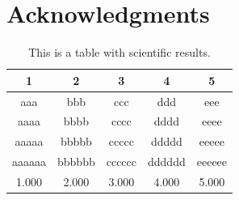 \documentclass[a4paper,11pt]{article}
\begin{document}
 



\section{ Acknowledgments }




\begin{table}
\centering
\caption{This is a table with scientific results.}
\medskip
\begin{tabular}{ccccc}
\hline
1 & 2 & 3 & 4 & 5\\
\hline
aaa & bbb & ccc & ddd & eee\\
aaaa & bbbb & cccc & dddd & eeee\\
aaaaa & bbbbb & ccccc & ddddd & eeeee\\
aaaaaa & bbbbbb & cccccc & dddddd & eeeeee\\
1.000 & 2.000 & 3.000 & 4.000 & 5.000\\
\hline
\end{tabular}
\end{table}
\end{document}
